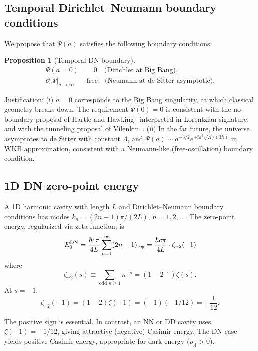 \documentclass[11pt,a4paper]{article}
\newtheorem{proposition}{Proposition}
\begin{document}
\subsection{Temporal Dirichlet--Neumann boundary conditions}

We propose that $\Psi(a)$ satisfies the following boundary conditions:

\begin{proposition}[Temporal DN boundary]
\begin{align}
\Psi(a=0) &= 0 \quad\text{(Dirichlet at Big Bang)},\\
\partial_a\Psi|_{a\to\infty} &\text{ free} \quad\text{(Neumann at de Sitter asymptotic)}.
\end{align}
\end{proposition}

Justification: (i) $a = 0$ corresponds to the Big Bang singularity,
at which classical geometry breaks down. The requirement
$\Psi(0) = 0$ is consistent with the no-boundary proposal of
Hartle and Hawking~\cite{HartleHawking1983} interpreted in
Lorentzian signature, and with the tunneling proposal of
Vilenkin~\cite{Vilenkin1982}. (ii) In the far future, the universe
asymptotes to de Sitter with constant $\Lambda$, and
$\Psi(a)\sim a^{-3/2}e^{\pm i a^3\sqrt\Lambda/(3\hbar)}$ in WKB
approximation, consistent with a Neumann-like (free-oscillation)
boundary condition.

\subsection{1D DN zero-point energy}

A 1D harmonic cavity with length $L$ and Dirichlet--Neumann boundary
conditions has modes $k_n = (2n-1)\pi/(2L)$, $n = 1, 2, \ldots$. The
zero-point energy, regularized via zeta function, is
\begin{equation}
E_0^{\rm DN} = \frac{\hbar c\pi}{4L}\sum_{n=1}^\infty(2n-1)_{\text{reg}}
= \frac{\hbar c\pi}{4L}\cdot\zeta_{\neg 2}(-1)
\end{equation}
where
\begin{equation}
\zeta_{\neg 2}(s) \equiv \sum_{\text{odd }n \geq 1}n^{-s} = (1 - 2^{-s})\zeta(s).
\end{equation}
At $s = -1$:
\begin{equation}
\zeta_{\neg 2}(-1) = (1-2)\zeta(-1) = (-1)(-1/12) = +\frac{1}{12}.
\end{equation}

The positive sign is essential. In contrast, an NN or DD cavity uses
$\zeta(-1) = -1/12$, giving attractive (negative) Casimir energy.
The DN case yields positive Casimir energy, appropriate for dark
energy ($\rho_\Lambda > 0$).
\end{document}
